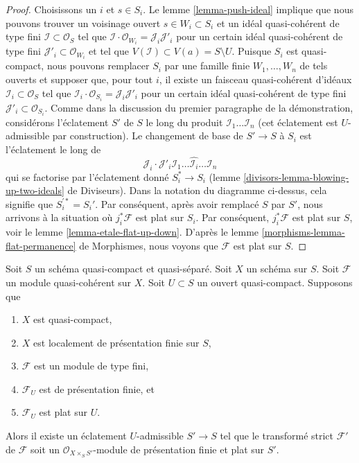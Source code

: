\begin{proof}
\medskip\noindent
Choisissons un $i$ et $s \in S_i$. Le lemme \ref{lemma-push-ideal}
implique que nous pouvons trouver un voisinage ouvert $s \in W_i \subset S_i$
et un idéal quasi-cohérent de type fini $\mathcal{I} \subset \mathcal{O}_S$
tel que $\mathcal{I} \cdot \mathcal{O}_{W_i} = \mathcal{J}_i \mathcal{J}'_i$
pour un certain idéal quasi-cohérent de type fini
$\mathcal{J}'_i \subset \mathcal{O}_{W_i}$
et tel que $V(\mathcal{I}) \subset V(a) = S \setminus U$.
Puisque $S_i$ est quasi-compact, nous pouvons remplacer $S_i$ par une famille finie
$W_1, \ldots, W_n$ de tels ouverts et supposer que, pour tout $i$, il existe
un faisceau quasi-cohérent d'idéaux $\mathcal{I}_i \subset \mathcal{O}_S$ tel
que $\mathcal{I}_i \cdot \mathcal{O}_{S_i} = \mathcal{J}_i \mathcal{J}'_i$
pour un certain idéal quasi-cohérent de type fini
$\mathcal{J}'_i \subset \mathcal{O}_{S_i}$.
Comme dans la discussion du premier paragraphe de la démonstration, considérons
l'éclatement $S'$ de $S$ le long du produit $\mathcal{I}_1 \ldots \mathcal{I}_n$
(cet éclatement est $U$-admissible par construction). Le changement de base de $S' \to S$
à $S_i$ est l'éclatement le long de
$$
\mathcal{J}_i \cdot
\mathcal{J}'_i \mathcal{I}_1 \ldots \hat{\mathcal{I}_i} \ldots \mathcal{I}_n
$$
qui se factorise par l'éclatement donné $S_i^* \to S_i$
(lemme \ref{divisors-lemma-blowing-up-two-ideals} de Diviseurs). Dans la notation
du diagramme ci-dessus, cela signifie que $S_i^{\prime *} = S_i'$. Par conséquent,
après avoir remplacé $S$ par $S'$, nous arrivons à la situation où
$j_i^*\mathcal{F}$ est plat sur $S_i$. Par conséquent, $j_i^*\mathcal{F}$ est plat
sur $S$, voir le
lemme \ref{lemma-etale-flat-up-down}.
D'après le lemme \ref{morphisms-lemma-flat-permanence} de Morphismes,
nous voyons que $\mathcal{F}$ est plat sur $S$.
\end{proof}

\begin{theorem}
\label{theorem-flatten-module}
Soit $S$ un schéma quasi-compact et quasi-séparé.
Soit $X$ un schéma sur $S$.
Soit $\mathcal{F}$ un module quasi-cohérent sur $X$.
Soit $U \subset S$ un ouvert quasi-compact. Supposons que
\begin{enumerate}
\item $X$ est quasi-compact,
\item $X$ est localement de présentation finie sur $S$,
\item $\mathcal{F}$ est un module de type fini,
\item $\mathcal{F}_U$ est de présentation finie, et
\item $\mathcal{F}_U$ est plat sur $U$.
\end{enumerate}
Alors il existe un éclatement $U$-admissible $S' \to S$ tel que le
transformé strict $\mathcal{F}'$ de $\mathcal{F}$ soit un
$\mathcal{O}_{X \times_S S'}$-module de présentation finie et
plat sur $S'$.
\end{theorem}

